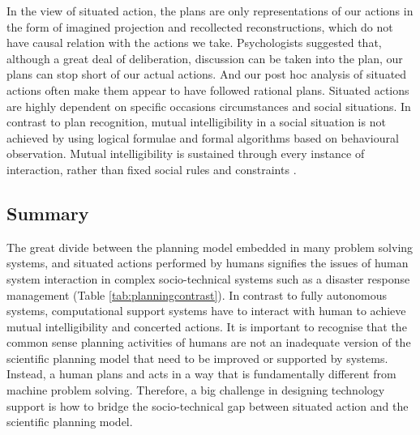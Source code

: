 In the view of situated action, the plans are only representations of our actions in the form of imagined projection and recollected reconstructions, which do not have causal relation with the actions we take. Psychologists \citep{Mead1934} suggested that, although a great deal of deliberation, discussion can be taken into the plan, our plans can stop short of our actual actions. And our post hoc analysis of situated actions often make them appear to have followed rational plans. Situated actions are highly dependent on specific occasions circumstances and social situations. In contrast to plan recognition, mutual intelligibility in a social situation is not achieved by using logical formulae and formal algorithms based on behavioural observation.  Mutual intelligibility is sustained through every instance of interaction, rather than fixed social rules and constraints \citep{Suchman1987}.\\


\subsection{Summary}
The great divide between the planning model embedded in many problem solving systems, and situated actions performed by humans signifies the issues of human system interaction in complex socio-technical systems such as a disaster response management (Table \ref{tab:planningcontrast}). In contrast to fully autonomous systems, computational support systems have to interact with human to achieve mutual intelligibility and concerted actions. It is important to recognise that the common sense planning activities of humans are not an inadequate version of the scientific planning model that need to be improved or supported by systems. Instead, a human plans and acts in a way that is fundamentally different from machine problem solving. Therefore, a big challenge in designing technology support is how to bridge the socio-technical gap between situated action and the scientific planning model.\\

